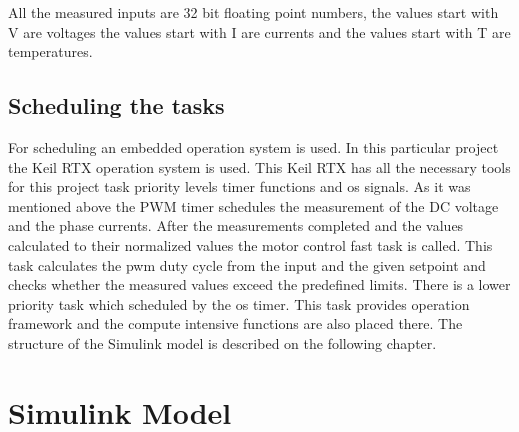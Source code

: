 All the measured inputs are 32 bit floating point numbers, the values start with V are voltages the values start with I are currents and the values start with T are temperatures.

\subsection{Scheduling the tasks}
For scheduling an embedded operation system is used. In this particular project the Keil RTX operation system is used. This Keil RTX has all the necessary tools for this project task priority levels timer functions and os signals. As it was mentioned above the PWM timer schedules the measurement of the DC voltage and the phase currents. After the measurements completed and the values calculated to their normalized values the motor control fast task is called. This task calculates the pwm duty cycle from the input and the given setpoint and checks whether the measured values exceed the predefined limits. 
There is a lower priority task which scheduled by the os timer. This task provides operation framework and the compute intensive functions are also placed there. The structure of the Simulink model is described on the following chapter.



\section{Simulink Model}

